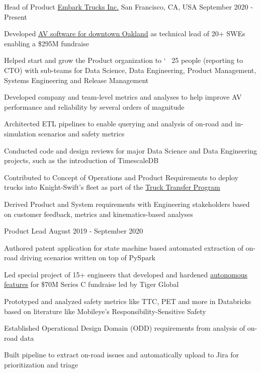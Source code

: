\begin{center}
  \vspace{-1mm}
  \cventry
    {Head of Product}
    {\href{https://embarktrucks.com}{Embark Trucks Inc.}}
    {San Francisco, CA, USA}
    {September 2020 - Present}
    {
      \begin{cvitems}
        \item {Developed \href{https://www.youtube.com/watch?v=6-02xycYbws}{\underline{AV software for downtown Oakland}} as technical lead of 20+ SWEs enabling a \$295M fundraise}
        \item {Helped start and grow the Product organization to \char`~ 25 people (reporting to CTO) with sub-teams for Data Science, Data Engineering, Product Management, Systems Engineering and Release Management}
        \item {Developed company and team-level metrics and analyses to help improve AV performance and reliability by several orders of magnitude}
        \item {Architected ETL pipelines to enable querying and analysis of on-road and in-simulation scenarios and safety metrics}
        \item {Conducted code and design reviews for major Data Science and Data Engineering projects, such as the introduction of TimescaleDB}
        \item {Contributed to Concept of Operations and Product Requirements to deploy trucks into Knight-Swift's fleet as part of the \href{https://www.youtube.com/watch?v=CBnEjgEuQuA}{\underline{Truck Transfer Program}}}
        \item {Derived Product and System requirements with Engineering stakeholders based on customer feedback, metrics and kinematics-based analyses}
      \end{cvitems} 
    }
\end{center}
\begin{center}
  \cvsubentry
    {Product Lead}
    {August 2019 - September 2020}
    {
      \begin{cvitems}
        \item {Authored patent application for state machine based automated extraction of on-road driving scenarios written on top of PySpark}
        \item {Led special project of 15+ engineers that developed and hardened \href{https://www.youtube.com/watch?v=llAQyawBau0}{\underline{autonomous features}} for \$70M Series C fundraise led by Tiger Global}
        \item {Prototyped and analyzed safety metrics like TTC, PET and more in Databricks based on literature like Mobileye's Responsibility-Sensitive Safety}
        \item {Established Operational Design Domain (ODD) requirements from analysis of on-road data}
        \item {Built pipeline to extract on-road issues and automatically upload to Jira for prioritization and triage}
      \end{cvitems} 
    }
\end{center}
